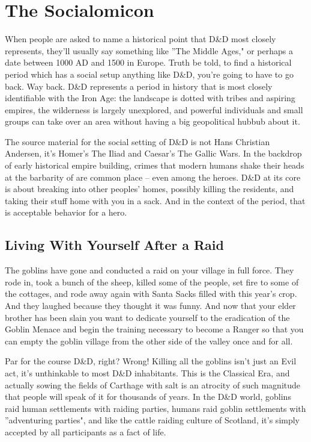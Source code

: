 
\section{The Socialomicon} %
\vspace*{-10pt}

When people are asked to name a historical point that D\&D most closely represents, they'll usually say something like ''The Middle Ages," or perhaps a date between 1000 AD and 1500 in Europe. Truth be told, to find a historical period which has a social setup anything like D\&D, you're going to have to go back. Way back. D\&D represents a period in history that is most closely identifiable with the Iron Age: the landscape is dotted with tribes and aspiring empires, the wilderness is largely unexplored, and powerful individuals and small groups can take over an area without having a big geopolitical hubbub about it.

The source material for the social setting of D\&D is not Hans Christian Andersen, it's Homer's The Iliad and Caesar's The Gallic Wars. In the backdrop of early historical empire building, crimes that modern humans shake their heads at the barbarity of are common place -- even among the heroes. D\&D at its core is about breaking into other peoples' homes, possibly killing the residents, and taking their stuff home with you in a sack. And in the context of the period, that is acceptable behavior for a hero.

\subsection{Living With Yourself After a Raid}

The goblins have gone and conducted a raid on your village in full force. They rode in, took a bunch of the sheep, killed some of the people, set fire to some of the cottages, and rode away again with Santa Sacks filled with this year's crop. And they laughed because they thought it was funny. And now that your elder brother has been slain you want to dedicate yourself to the eradication of the Goblin Menace and begin the training necessary to become a Ranger so that you can empty the goblin village from the other side of the valley once and for all.

Par for the course D\&D, right? Wrong! Killing all the goblins isn't just an Evil act, it's unthinkable to most D\&D inhabitants. This is the Classical Era, and actually sowing the fields of Carthage with salt is an atrocity of such magnitude that people will speak of it for thousands of years. In the D\&D world, goblins raid human settlements with raiding parties, humans raid goblin settlements with ''adventuring parties", and like the cattle raiding culture of Scotland, it's simply accepted by all participants as a fact of life.

